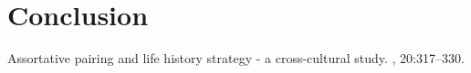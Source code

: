 \documentclass[DIV=calc, paper=a4, fontsize=11pt, twocolumn]{scrartcl}
\begin{document}


\section*{Conclusion}





\begin{thebibliography}{99} %




\newblock Assortative pairing and life history strategy - a cross-cultural
  study.
, 20:317--330.
 
\end{thebibliography}

\end{document}
